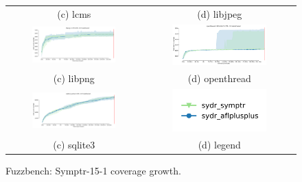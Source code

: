 \begin{figure}[h]
{\begin{tabular}{cc}
            (c) lcms                                                                                                 & (d) libjpeg                                                                                                    \\[6pt]
            \includegraphics[width=0.65\textwidth]{assets/fuzzbench/symptr-15-1/libpng-1.2.56_coverage_growth.png}   & \includegraphics[width=0.65\textwidth]{assets/fuzzbench/symptr-15-1/openthread-2019-12-23_coverage_growth.png} \\
            (c) libpng                                                                                               & (d) openthread                                                                                                 \\[6pt]
            \includegraphics[width=0.65\textwidth]{assets/fuzzbench/symptr-15-1/sqlite3_ossfuzz_coverage_growth.png} & \includegraphics[width=0.65\textwidth]{assets/fuzzbench/symptr-15-1/fuzzbench-legend.png}                      \\
            (c) sqlite3                                                                                              & (d) legend                                                                                                     \\[6pt]
        \end{tabular}
    }
    \caption{Fuzzbench: Symptr-15-1 coverage growth.}
    \label{fig:fuzzbench:symptr-15-1}
\end{figure}

